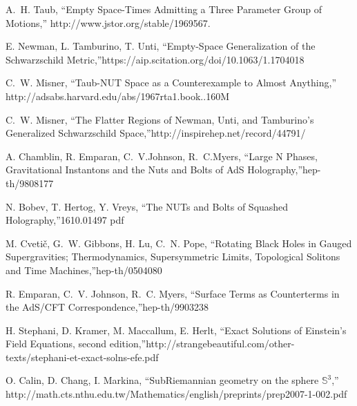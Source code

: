 \documentclass[12pt, a4paper]{article}
\numberwithin{equation}{section}
\begin{document}
\providecommand{\href}[2]{#2}\begingroup\raggedright\begin{thebibliography}{10}
\small
{}
A.~H. Taub, ``{Empty Space-Times Admitting a Three Parameter Group of Motions},''
\href{http://www.jstor.org/stable/1969567}{http://www.jstor.org/stable/1969567}.


E. Newman, L. Tamburino, T. Unti, ``{Empty-Space Generalization of the Schwarzschild Metric},''\href{https://aip.scitation.org/doi/10.1063/1.1704018}{https://aip.scitation.org/doi/10.1063/1.1704018}

C.~W. Misner, ``{Taub-NUT Space as a Counterexample to Almost Anything},''
\href{http://adsabs.harvard.edu/abs/1967rta1.book..160M}{http://adsabs.harvard.edu/abs/1967rta1.book..160M}

C.~W. Misner, ``{The Flatter Regions of Newman, Unti, and Tamburino's Generalized Schwarzschild Space},''\href{http://inspirehep.net/record/44791/}{http://inspirehep.net/record/44791/}

A. Chamblin, R. Emparan, C.~V.Johnson, R.~C.Myers, ``{Large N Phases, Gravitational Instantons and the Nuts and Bolts of AdS Holography},''\href{https://arxiv.org/abs/hep-th/9808177}{hep-th/9808177}

N. Bobev, T. Hertog, Y. Vreys, ``{The NUTs and Bolts of Squashed Holography},''\href{https://arxiv.org/abs/1610.01497}{1610.01497} \href{https://arxiv.org/pdf/1610.01497.pdf}{pdf}

M. Cveti\v c, G.~W. Gibbons, H. Lu, C.~N. Pope, ``{Rotating Black Holes in Gauged Supergravities; Thermodynamics, Supersymmetric Limits, Topological Solitons and Time Machines},''\href{https://arxiv.org/abs/hep-th/0504080}{hep-th/0504080}

R. Emparan, C.~V. Johnson, R.~C. Myers, ``{Surface Terms as Counterterms in the AdS/CFT Correspondence},''\href{https://arxiv.org/abs/hep-th/9903238}{hep-th/9903238}

H. Stephani, D. Kramer, M. Maccallum, E. Herlt, ``{Exact Solutions of Einstein's Field Equations, second edition},''\href{http://strangebeautiful.com/other-texts/stephani-et-exact-solns-efe.pdf}{http://strangebeautiful.com/other-texts/stephani-et-exact-solns-efe.pdf}

O. Calin, D. Chang, I. Markina, ``{SubRiemannian geometry on the sphere $\mathbb{S}^3$},'' \href{http://math.cts.nthu.edu.tw/Mathematics/english/preprints/prep2007-1-002.pdf}{http://math.cts.nthu.edu.tw/Mathematics/english/preprints/prep2007-1-002.pdf}


\end{thebibliography}
\end{document}
